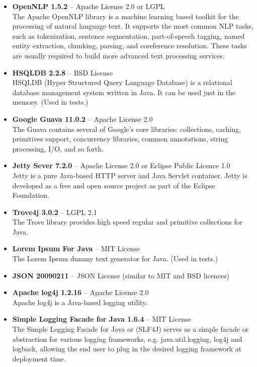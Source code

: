\begin{itemize}
\item {\bf OpenNLP 1.5.2} -- Apache License 2.0 or LGPL \\
The Apache OpenNLP library is a machine learning based toolkit for the processing of natural language text. It supports the most common NLP tasks, such as tokenization, sentence segmentation, part-of-speech tagging, named entity extraction, chunking, parsing, and coreference resolution. These tasks are usually required to build more advanced text processing services.

\item {\bf HSQLDB 2.2.8} -- BSD License \\
HSQLDB (Hyper Structured Query Language Database) is a relational database management system written in Java. It can be used just in the memory. (Used in tests.)

\item {\bf Google Guava 11.0.2} -- Apache License 2.0 \\
The Guava contains several of Google's core libraries: collections, caching, primitives support, concurrency libraries, common annotations, string processing, I/O, and so forth.

\item {\bf Jetty Sever 7.2.0} -- Apache License 2.0 or Eclipse Public Licence 1.0 \\
Jetty is a pure Java-based HTTP server and Java Servlet container. Jetty is developed as a free and open source project as part of the Eclipse Foundation.

\item {\bf Trove4j 3.0.2} -- LGPL 2.1 \\
The Trove library provides high speed regular and primitive collections for Java. 

\item {\bf Lorem Ipsum For Java} -- MIT License \\
The Lorem Ipsum dummy text generator for Java. (Used in tests.)

\item {\bf JSON 20090211} -- JSON License (similar to MIT and BSD licences)

\item {\bf Apache log4j 1.2.16}  -- Apache License 2.0 \\
Apache log4j is a Java-based logging utility.

\item {\bf Simple Logging Facade for Java 1.6.4} -- MIT License \\
The Simple Logging Facade for Java or (SLF4J) serves as a simple facade or abstraction for various logging frameworks, e.g. java.util.logging, log4j and logback, allowing the end user to plug in the desired logging framework at deployment time.


\end{itemize}
